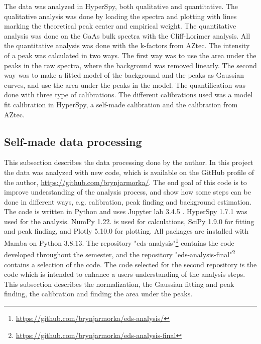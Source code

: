 

The data was analyzed in HyperSpy, both qualitative and quantitative.
The qualitative analysis was done by loading the spectra and plotting with lines marking the theoretical peak center and empirical weight.
The quantitative analysis was done on the GaAs bulk spectra with the Cliff-Lorimer analysis.
All the quantitative analysis was done with the k-factors from AZtec.
The intensity of a peak was calculated in two ways.
The first way was to use the area under the peaks in the raw spectra, where the background was removed linearly.
The second way was to make a fitted model of the background and the peaks as Gaussian curves, and use the area under the peaks in the model.
The quantification was done with three type of calibrations.
The different calibrations used was a model fit calibration in HyperSpy, a self-made calibration and the calibration from AZtec.


%
%

\subsection{Self-made data processing}
\label{sec:method:data_processing:self_made}

This subsection describes the data processing done by the author.
In this project the data was analyzed with new code, which is available on the GitHub profile of the author, \url{https://github.com/brynjarmorka/}.
The end goal of this code is to improve understanding of the analysis process, and show how some steps can be done in different ways, e.g. calibration, peak finding and background estimation.
The code is written in Python \cite{python} and uses Jupyter lab 3.4.5 \cite{jupyter}.
HyperSpy 1.7.1 \cite{hyperspy_1.7.1} was used for the analysis.
NumPy 1.22. \cite{numpy} is used for calculations, SciPy 1.9.0 \cite{2020SciPy} for fitting and peak finding, and Plotly 5.10.0 \cite{plotly} for plotting.
All packages are installed with Mamba on Python 3.8.13.
The repository "eds-analysis"\footnote{\url{https://github.com/brynjarmorka/eds-analysis/}} contains the code developed throughout the semester, and the repository "eds-analysis-final"\footnote{\url{https://github.com/brynjarmorka/eds-analysis-final}} contains a selection of the code.
The code selected for the second repository is the code which is intended to enhance a users understanding of the analysis steps.
This subsection describes the normalization, the Gaussian fitting and peak finding, the calibration and finding the area under the peaks.




